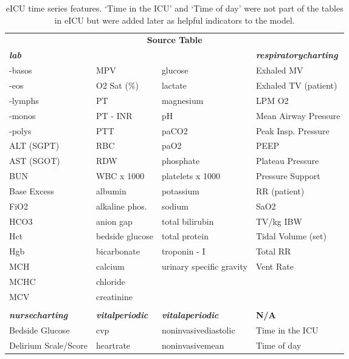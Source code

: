 \documentclass[sigconf]{acmart}
\begin{document}
\begin{table*}[h]
    \caption{eICU time series features. `Time in the ICU' and `Time of day' were not part of the tables in eICU but were added later as helpful indicators to the model.}
    \label{tab:timeseries}
    \centering
    \begin{tabular}{llll}
        \toprule
        \multicolumn{4}{c}{\textbf{Source Table}} \\
        \multicolumn{3}{l}{\textbf{\textit{lab}}} & \textbf{\textit{respiratorycharting}} \\
        \midrule
        -basos & MPV & glucose & Exhaled MV \\
        -eos & O2 Sat (\%) & lactate & Exhaled TV (patient) \\
        -lymphs & PT & magnesium & LPM O2 \\
        -monos & PT - INR & pH & Mean Airway Pressure \\
        -polys & PTT & paCO2 & Peak Insp. Pressure \\
        ALT (SGPT) & RBC & paO2 & PEEP \\
        AST (SGOT) & RDW & phosphate & Plateau Pressure \\
        BUN & WBC x 1000 & platelets x 1000 & Pressure Support \\
        Base Excess & albumin & potassium & RR (patient) \\
        FiO2 & alkaline phos. & sodium & SaO2 \\
        HCO3 & anion gap & total bilirubin & TV/kg IBW \\
        Hct & bedside glucose & total protein & Tidal Volume (set) \\
        Hgb & bicarbonate & troponin - I & Total RR \\
        MCH & calcium & urinary specific gravity & Vent Rate \\
        MCHC & chloride & & \\
        MCV & creatinine & & \\
        \vspace{-0.8em}\\
        \toprule
        \textbf{\textit{nursecharting}} &  \textbf{\textit{vitalperiodic}} & \textbf{\textit{vitalaperiodic}} & \textbf{N/A} \\
        \midrule
        Bedside Glucose & cvp & noninvasivediastolic & Time in the ICU \\
        Delirium Scale/Score & heartrate & noninvasivemean & Time of day \\

\end{tabular}
\end{table*}
\end{document}
